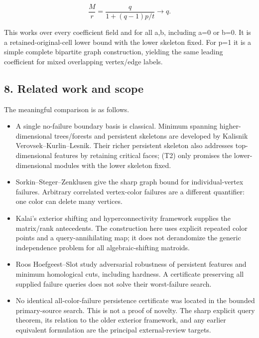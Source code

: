 \[
\frac Mr=
          \frac{q}{1+(q-1)p/t}\longrightarrow q.
 \tag{T24}
\]

This works over every coefficient field and for all a,b, including a=0 or b=0. It is a retained-original-cell lower bound with the lower skeleton fixed. For p=1 it is a simple complete bipartite graph construction, yielding the same leading coefficient for mixed overlapping vertex/edge labels.

\hypertarget{af-3f6acd6e5b-related-work-and-scope}{%
\subsection{8. Related work and scope}\label{af-3f6acd6e5b-related-work-and-scope}}

The meaningful comparison is as follows.

\begin{itemize}
\tightlist
\item
  A single no-failure boundary basis is classical. Minimum spanning higher-dimensional trees/forests and persistent skeletons are developed by Kalisnik Verovsek--Kurlin--Lesnik. Their richer persistent skeleton also addresses top-dimensional features by retaining critical faces; (T2) only promises the lower-dimensional modules with the lower skeleton fixed.
\item
  Sorkin--Steger--Zenklusen give the sharp graph bound for individual-vertex failures. Arbitrary correlated vertex-color failures are a different quantifier: one color can delete many vertices.
\item
  Kalai's exterior shifting and hyperconnectivity framework supplies the matrix/rank antecedents. The construction here uses explicit repeated color points and a query-annihilating map; it does not derandomize the generic independence problem for all algebraic-shifting matroids.
\item
  Roos Hoefgeest--Slot study adversarial robustness of persistent features and minimum homological cuts, including hardness. A certificate preserving all supplied failure queries does not solve their worst-failure search.
\item
  No identical all-color-failure persistence certificate was located in the bounded primary-source search. This is not a proof of novelty. The sharp explicit query theorem, its relation to the older exterior framework, and any earlier equivalent formulation are the principal external-review targets.
\end{itemize}


